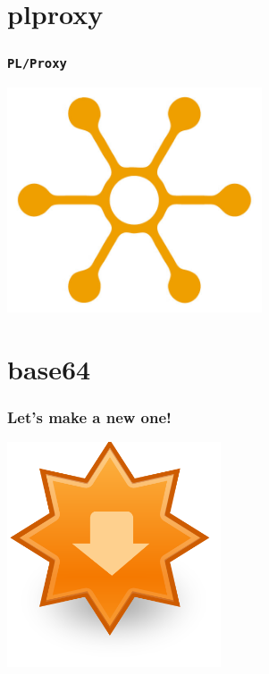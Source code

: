 \documentclass{beamer}
\begin{document}
\section{plproxy}

\begin{frame}[fragile]
  \frametitle{\texttt{PL/Proxy}}

\begin{center}
  \includegraphics[height=18em]{distribution.jpg}
\end{center}
\end{frame}


\section{base64}

\begin{frame}[fragile]
  \frametitle{Let's make a new one!}

\begin{center}
  \includegraphics[height=18em]{extension-update.png}
\end{center}
\end{frame}
\end{document}
